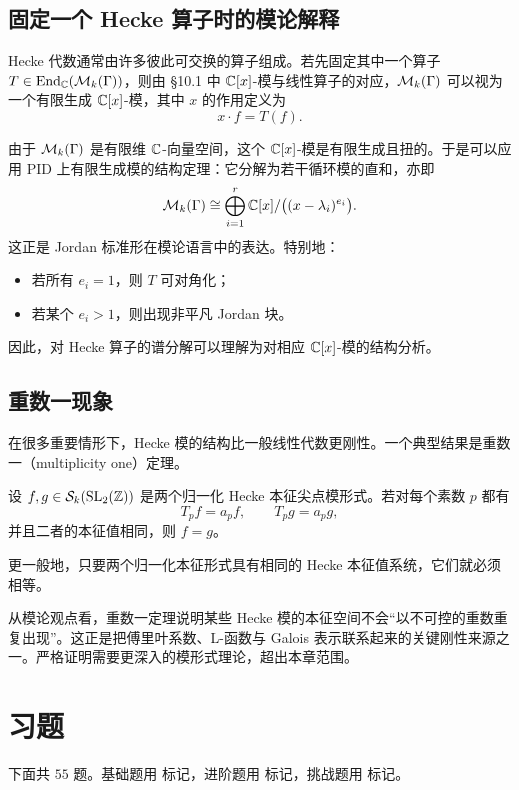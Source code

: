 \subsection{固定一个 Hecke 算子时的模论解释}

Hecke 代数通常由许多彼此可交换的算子组成。若先固定其中一个算子 $T\in \mathrm{End}_{\mathbb{C}}(\mathcal{M}_k(\Gamma))$，则由 \S10.1 中 $\mathbb{C}[x]$-模与线性算子的对应，$\mathcal{M}_k(\Gamma)$ 可以视为一个有限生成 $\mathbb{C}[x]$-模，其中 $x$ 的作用定义为
\[
x\cdot f=T(f).
\]

由于 $\mathcal{M}_k(\Gamma)$ 是有限维 $\mathbb{C}$-向量空间，这个 $\mathbb{C}[x]$-模是有限生成且扭的。于是可以应用 PID 上有限生成模的结构定理：它分解为若干循环模的直和，亦即
\[
\mathcal{M}_k(\Gamma)\cong \bigoplus_{i=1}^r \mathbb{C}[x]/\bigl((x-\lambda_i)^{e_i}\bigr).
\]
这正是 Jordan 标准形在模论语言中的表达。特别地：
\begin{itemize}
  \item 若所有 $e_i=1$，则 $T$ 可对角化；
  \item 若某个 $e_i>1$，则出现非平凡 Jordan 块。
\end{itemize}

因此，对 Hecke 算子的谱分解可以理解为对相应 $\mathbb{C}[x]$-模的结构分析。

\subsection{重数一现象}

在很多重要情形下，Hecke 模的结构比一般线性代数更刚性。一个典型结果是重数一（multiplicity one）定理。

\begin{theorem}
设 $f,g\in \mathcal{S}_k(\mathrm{SL}_2(\mathbb{Z}))$ 是两个归一化 Hecke 本征尖点模形式。若对每个素数 $p$ 都有
\[
T_pf=a_pf,\qquad T_pg=a_pg,
\]
并且二者的本征值相同，则 $f=g$。

更一般地，只要两个归一化本征形式具有相同的 Hecke 本征值系统，它们就必须相等。
\end{theorem}

\begin{remark}
从模论观点看，重数一定理说明某些 Hecke 模的本征空间不会“以不可控的重数重复出现”。这正是把傅里叶系数、L-函数与 Galois 表示联系起来的关键刚性来源之一。严格证明需要更深入的模形式理论，超出本章范围。
\end{remark}

\section*{习题}

下面共 $55$ 题。基础题用 \basic{} 标记，进阶题用 \medium{} 标记，挑战题用 \hard{} 标记。

